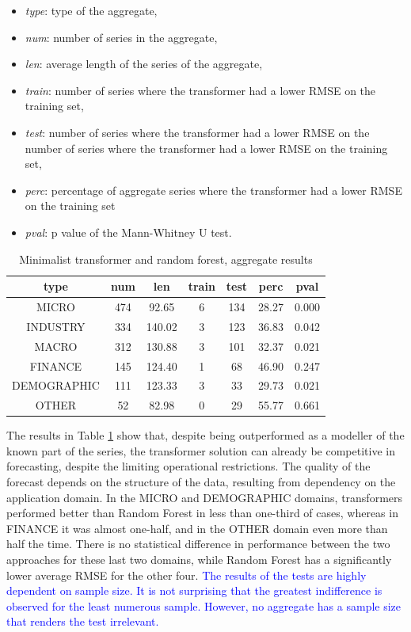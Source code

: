 \documentclass[algorithms,article,submit,pdftex,moreauthors]{Definitions/mdpi}
\begin{document}
\begin{itemize}
	\item {\it type}: type of the aggregate,
	\item {\it num}: number of series in the aggregate,
	\item {\it len}: average length of the series of the aggregate,
	\item {\it train}: number of series where the transformer had a lower RMSE on the training set,
	\item {\it test}: number of series where the transformer had a lower RMSE on the number of series where the transformer had a lower RMSE on the training set,
	\item {\it perc}: percentage of aggregate series where the transformer had a lower RMSE on the training set
	\item {\it pval}: p value of the Mann-Whitney U test.
\end{itemize}

\begin{table}[H]
\caption{Minimalist transformer and random forest, aggregate results}
\label{tab:aggregate}
\centering
\begin{tabular}{ccccccc}
\toprule
{\bf type} & {\bf num} & len & {\bf train} & {\bf test} & {\bf perc} & {\bf pval}\\
\midrule
MICRO 		& 474 &  92.65 & 6 & 134 & 28.27 & 0.000\\
INDUSTRY 	& 334 & 140.02 & 3 & 123 & 36.83 & 0.042\\
MACRO 		& 312 & 130.88 & 3 & 101 & 32.37 & 0.021\\
FINANCE 	   & 145 & 124.40 & 1 &  68 & 46.90 & 0.247\\
DEMOGRAPHIC & 111 & 123.33 & 3 &  33 & 29.73 & 0.021\\
OTHER 		&  52 &  82.98 & 0 &  29 & 55.77 & 0.661\\
\bottomrule
\end{tabular}
\end{table}

The results in Table \ref{tab:aggregate}  show that, despite being outperformed as a modeller of the known part of the series, the transformer solution can already be competitive in forecasting, despite the limiting operational restrictions. The quality of the forecast depends on the structure of the data, resulting from dependency on the application domain. In the MICRO and DEMOGRAPHIC domains, transformers performed better than Random Forest in less than one-third of cases, whereas in FINANCE it was almost one-half, and in the OTHER domain even more than half the time. There is no statistical difference in performance between the two approaches for these last two domains, while Random Forest has a significantly lower average RMSE for the other four. \textcolor{blue}{The results of the tests are highly dependent on sample size. It is not surprising that the greatest indifference is observed for the least numerous sample. However, no aggregate has a sample size that renders the test irrelevant.}
\end{document}

